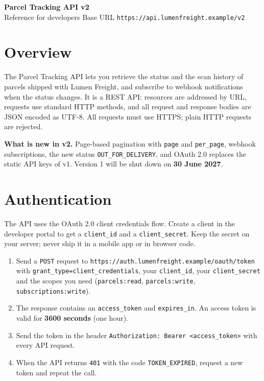 \documentclass[10pt,a4paper]{article}
\newcommand{\code}[1]{\texttt{#1}}
\begin{document}
{\fontsize{24}{28}\selectfont\bfseries\color{api} Parcel Tracking API v2}\\[0.2em]
{\large Reference for developers \textperiodcentered{} Base URL \code{https://api.lumenfreight.example/v2}}

\section{Overview}
The Parcel Tracking API lets you retrieve the status and the scan history of parcels shipped with Lumen Freight, and
subscribe to webhook notifications when the status changes. It is a REST API: resources are addressed by URL, requests
use standard HTTP methods, and all request and response bodies are JSON encoded as UTF-8. All requests must use
HTTPS; plain HTTP requests are rejected.

\begin{tcolorbox}[colback=api!6, colframe=api, boxrule=0.5pt, arc=2pt, left=8pt, right=8pt, top=4pt, bottom=4pt]
\textbf{What is new in v2.} Page-based pagination with \code{page} and \code{per\_page}, webhook subscriptions, the
new status \code{OUT\_FOR\_DELIVERY}, and OAuth 2.0 replaces the static API keys of v1. Version 1 will be shut down
on \textbf{30 June 2027}.
\end{tcolorbox}

\section{Authentication}
The API uses the OAuth 2.0 client credentials flow. Create a client in the developer portal to get a
\code{client\_id} and a \code{client\_secret}. Keep the secret on your server; never ship it in a mobile app or in
browser code.

\begin{enumerate}[leftmargin=1.6em, itemsep=0.15em]
  \item Send a \code{POST} request to \code{https://auth.lumenfreight.example/oauth/token} with
        \code{grant\_type=client\_credentials}, your \code{client\_id}, your \code{client\_secret} and the scopes you need
        (\code{parcels:read}, \code{parcels:write}, \code{subscriptions:write}).
  \item The response contains an \code{access\_token} and \code{expires\_in}. An access token is valid for
        \textbf{3600 seconds} (one hour).
  \item Send the token in the header \code{Authorization: Bearer <access\_token>} with every API request.
  \item When the API returns \code{401} with the code \code{TOKEN\_EXPIRED}, request a new token and repeat the call.
\end{enumerate}
\end{document}
